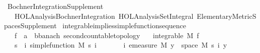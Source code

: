 %
\begin{isabellebody}%
%
%
\isadelimtheory
\isanewline
\isanewline
%
\endisadelimtheory
%
\isatagtheory
{}\isamarkupfalse%
\ Bochner{\isacharunderscore}{\kern0pt}Integration{\isacharunderscore}{\kern0pt}Supplement\isanewline
\ \ \ {\isachardoublequoteopen}HOL{\isacharminus}{\kern0pt}Analysis{\isachardot}{\kern0pt}Bochner{\isacharunderscore}{\kern0pt}Integration{\isachardoublequoteclose}\ {\isachardoublequoteopen}HOL{\isacharminus}{\kern0pt}Analysis{\isachardot}{\kern0pt}Set{\isacharunderscore}{\kern0pt}Integral{\isachardoublequoteclose}\ Elementary{\isacharunderscore}{\kern0pt}Metric{\isacharunderscore}{\kern0pt}Spaces{\isacharunderscore}{\kern0pt}Supplement\isanewline
{}%
\endisatagtheory
{\isafoldtheory}%
%
\isadelimtheory
%
\endisadelimtheory
%
\isadelimdocument
%
\endisadelimdocument
%
\isatagdocument
%
\isamarkuptrue%
%
\isamarkuptrue%
%
\endisatagdocument
{\isafolddocument}%
%
\isadelimdocument
%
\endisadelimdocument
{}\isamarkupfalse%
\ integrable{\isacharunderscore}{\kern0pt}implies{\isacharunderscore}{\kern0pt}simple{\isacharunderscore}{\kern0pt}function{\isacharunderscore}{\kern0pt}sequence{\isacharcolon}{\kern0pt}\isanewline
\ \ \ f\ {\isacharcolon}{\kern0pt}{\isacharcolon}{\kern0pt}\ {\isachardoublequoteopen}{\isacharprime}{\kern0pt}a\ {\isasymRightarrow}\ {\isacharprime}{\kern0pt}b{\isacharcolon}{\kern0pt}{\isacharcolon}{\kern0pt}{\isacharbraceleft}{\kern0pt}banach{\isacharcomma}{\kern0pt}\ second{\isacharunderscore}{\kern0pt}countable{\isacharunderscore}{\kern0pt}topology{\isacharbraceright}{\kern0pt}{\isachardoublequoteclose}\isanewline
\ \ \ {\isachardoublequoteopen}integrable\ M\ f{\isachardoublequoteclose}\isanewline
\ \ \ s\ \ {\isachardoublequoteopen}{\isasymAnd}i{\isachardot}{\kern0pt}\ simple{\isacharunderscore}{\kern0pt}function\ M\ {\isacharparenleft}{\kern0pt}s\ i{\isacharparenright}{\kern0pt}{\isachardoublequoteclose}\isanewline
\ \ \ \ \ \ \ {\isachardoublequoteopen}{\isasymAnd}i{\isachardot}{\kern0pt}\ emeasure\ M\ {\isacharbraceleft}{\kern0pt}y\ {\isasymin}\ space\ M{\isachardot}{\kern0pt}\ s\ i\ y\ {\isasymnoteq}\ {}{\isacharbraceright}{\kern0pt}\ {\isasymnoteq}\ {\isasyminfinity}{\isachardoublequoteclose}\isanewline

\end{isabellebody}
